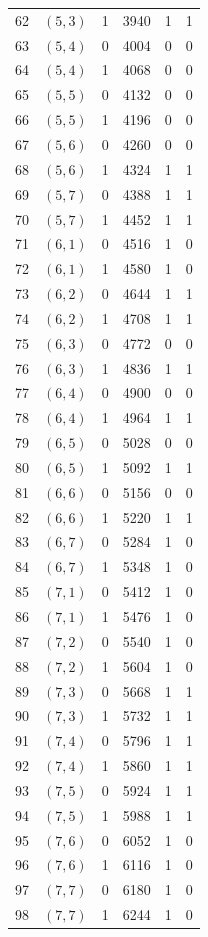 {\begin{longtable}{@{}rrrrrr@{}}
62 & $(5,3)$ & 1 & 3940 & 1 & 1\\
63 & $(5,4)$ & 0 & 4004 & 0 & 0\\
64 & $(5,4)$ & 1 & 4068 & 0 & 0\\
65 & $(5,5)$ & 0 & 4132 & 0 & 0\\
66 & $(5,5)$ & 1 & 4196 & 0 & 0\\
67 & $(5,6)$ & 0 & 4260 & 0 & 0\\
68 & $(5,6)$ & 1 & 4324 & 1 & 1\\
69 & $(5,7)$ & 0 & 4388 & 1 & 1\\
70 & $(5,7)$ & 1 & 4452 & 1 & 1\\
71 & $(6,1)$ & 0 & 4516 & 1 & 0\\
72 & $(6,1)$ & 1 & 4580 & 1 & 0\\
73 & $(6,2)$ & 0 & 4644 & 1 & 1\\
74 & $(6,2)$ & 1 & 4708 & 1 & 1\\
75 & $(6,3)$ & 0 & 4772 & 0 & 0\\
76 & $(6,3)$ & 1 & 4836 & 1 & 1\\
77 & $(6,4)$ & 0 & 4900 & 0 & 0\\
78 & $(6,4)$ & 1 & 4964 & 1 & 1\\
79 & $(6,5)$ & 0 & 5028 & 0 & 0\\
80 & $(6,5)$ & 1 & 5092 & 1 & 1\\
81 & $(6,6)$ & 0 & 5156 & 0 & 0\\
82 & $(6,6)$ & 1 & 5220 & 1 & 1\\
83 & $(6,7)$ & 0 & 5284 & 1 & 0\\
84 & $(6,7)$ & 1 & 5348 & 1 & 0\\
85 & $(7,1)$ & 0 & 5412 & 1 & 0\\
86 & $(7,1)$ & 1 & 5476 & 1 & 0\\
87 & $(7,2)$ & 0 & 5540 & 1 & 0\\
88 & $(7,2)$ & 1 & 5604 & 1 & 0\\
89 & $(7,3)$ & 0 & 5668 & 1 & 1\\
90 & $(7,3)$ & 1 & 5732 & 1 & 1\\
91 & $(7,4)$ & 0 & 5796 & 1 & 1\\
92 & $(7,4)$ & 1 & 5860 & 1 & 1\\
93 & $(7,5)$ & 0 & 5924 & 1 & 1\\
94 & $(7,5)$ & 1 & 5988 & 1 & 1\\
95 & $(7,6)$ & 0 & 6052 & 1 & 0\\
96 & $(7,6)$ & 1 & 6116 & 1 & 0\\
97 & $(7,7)$ & 0 & 6180 & 1 & 0\\
98 & $(7,7)$ & 1 & 6244 & 1 & 0\\
\end{longtable}}

